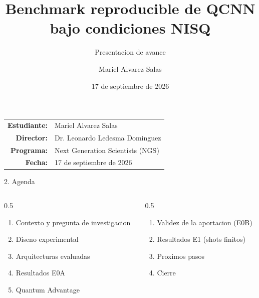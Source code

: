 \documentclass[aspectratio=169]{beamer}
\title{Benchmark reproducible de QCNN bajo condiciones NISQ}
\subtitle{Presentacion de avance}
\author{Mariel Alvarez Salas}
\date{17 de septiembre de 2026}
\begin{document}
\begin{frame}[plain]
  \vspace{1.2cm}
  \begin{center}
  \vspace{1.0cm}

  \begin{tabular}{r l}
    \textbf{Estudiante:} & Mariel Alvarez Salas \\
    \textbf{Director:} & Dr. Leonardo Ledesma Dominguez \\
    \textbf{Programa:} & Next Generation Scientists (NGS) \\
    \textbf{Fecha:} & 17 de septiembre de 2026 \\
  \end{tabular}
  \end{center}
\end{frame}

\begin{frame}{2. Agenda}
  \begin{columns}[T]
    \begin{column}{0.5\textwidth}
      \begin{enumerate}
        \setlength{\itemsep}{7pt}
        \item[3.] Contexto y pregunta de investigacion
        \item[4.] Diseno experimental
        \item[5.] Arquitecturas evaluadas
        \item[6.] Resultados E0A
        \item[7.] Quantum Advantage
      \end{enumerate}
    \end{column}
    \begin{column}{0.5\textwidth}
      \begin{enumerate}
        \setlength{\itemsep}{7pt}
        \item[8.] Validez de la aportacion (E0B)
        \item[9.] Resultados E1 (shots finitos)
        \item[10.] Proximos pasos
        \item[11.] Cierre
      \end{enumerate}
    \end{column}
  \end{columns}
\end{frame}
\end{document}
